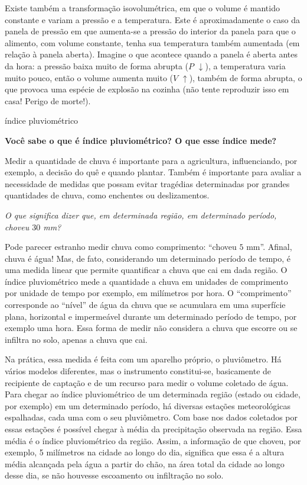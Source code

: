 \begin{reflection}
Existe também a transformação isovolumétrica, em que o volume é mantido constante e variam a pressão e a temperatura. Este é aproximadamente o caso da panela de pressão em que aumenta-se a pressão do interior da panela para que o alimento, com volume constante, tenha sua temperatura também aumentada (em relação à panela aberta). Imagine o que acontece quando a panela é aberta antes da hora: a pressão baixa muito de forma abrupta ($P$ \(\downarrow\)), a temperatura varia muito pouco, então o volume aumenta muito ($V$ \(\uparrow\)), também de forma abrupta, o que provoca uma espécie de explosão na cozinha (não tente reproduzir isso em casa! Perigo de morte!).
\end{reflection}

\begin{task}{índice pluviométrico}



\textbf{Você sabe o que é índice pluviométrico? O que esse índice mede?}

Medir a quantidade de chuva é importante para a agricultura, influenciando, por exemplo, a decisão do quê e quando plantar.  Também é importante para avaliar a necessidade de medidas que possam evitar tragédias determinadas por grandes quantidades de chuva, como enchentes ou deslizamentos.

\emph{O que significa dizer que, em determinada região, em determinado período, choveu $30$ mm?}

Pode parecer estranho medir chuva como comprimento: “choveu $5$ mm”. Afinal, chuva é água! Mas, de fato, considerando um determinado período de tempo, é uma medida linear que permite quantificar a chuva que cai em dada região. O índice pluviométrico mede a quantidade a chuva em unidades de comprimento por unidade de tempo \textendash{} por exemplo, em milímetros por hora. O “comprimento” corresponde ao “nível” de água da chuva que se acumulara em uma superfície plana, horizontal e impermeável durante um determinado período de tempo, por exemplo uma hora. Essa forma de medir não considera a chuva que escorre ou se infiltra no solo, apenas a chuva que cai.

Na prática, essa medida é feita com um aparelho próprio, o pluviômetro. Há vários modelos diferentes, mas o instrumento constitui-se, basicamente de recipiente de captação e de um recurso para medir o volume coletado de água. Para chegar ao índice pluviométrico de um determinada região (estado ou cidade, por exemplo) em um determinado período, há diversas estações meteorológicas espalhadas, cada uma com o seu pluviômetro. Com base nos dados coletados por essas estações é possível chegar à média da precipitação observada na região. Essa média é o índice pluviométrico da região. Assim, a informação de que choveu, por exemplo, 5 milímetros na cidade ao longo do dia, significa que essa é a altura média alcançada pela água a partir do chão, na área total da cidade ao longo desse dia, se não houvesse escoamento ou infiltração no solo.


\end{task}
